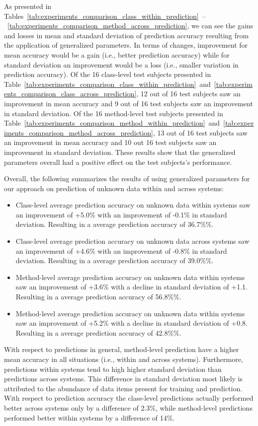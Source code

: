 As presented in Tables~\ref{tab:experiments_comparison_class_within_prediction}~--~\ref{tab:experiments_comparison_method_across_prediction}, we can see the gains and losses in mean and standard deviation of prediction accuracy resulting from the application of generalized parameters. In terms of changes, improvement for mean accuracy would be a gain (i.e., better prediction accuracy) while for standard deviation an improvement would be a loss (i.e., smaller variation in prediction accuracy). Of the 16 class-level test subjects presented in Table~\ref{tab:experiments_comparison_class_within_prediction}~and~\ref{tab:experiments_comparison_class_across_prediction}, 12 out of 16 test subjects saw an improvement in mean accuracy and 9 out of 16 test subjects saw an improvement in standard deviation. Of the 16 method-level test subjects presented in Table~\ref{tab:experiments_comparison_method_within_prediction}~and~\ref{tab:experiments_comparison_method_across_prediction}, 13 out of 16 test subjects saw an improvement in mean accuracy and 10 out 16 test subjects saw an improvement in standard deviation. These results show that the generalized parameters overall had a positive effect on the test subjects's performance. 

Overall, the following summarizes the results of using generalized parameters for our approach on prediction of unknown data within and across systems:
\begin{itemize}
  \item Class-level average prediction accuracy on unknown data within systems saw an improvement of +5.0\% with an improvement of -0.1\% in standard deviation. Resulting in a average prediction accuracy of 36.7\%\%.
  \item Class-level average prediction accuracy on unknown data across systems saw an improvement of +4.6\% with an improvement of -0.8\% in standard deviation. Resulting in a average prediction accuracy of 39.0\%\%.
  \item Method-level average prediction accuracy on unknown data within systems saw an improvement of +3.6\% with a decline in standard deviation of +1.1. Resulting in a average prediction accuracy of 56.8\%\%.
  \item Method-level average prediction accuracy on unknown data within systems saw an improvement of +5.2\% with a decline in standard deviation of +0.8. Resulting in a average prediction accuracy of 42.8\%\%.
\end{itemize}
With respect to predictions in general, method-level prediction have a higher mean accuracy in all situations (i.e., within and across systems). Furthermore, predictions within systems tend to high higher standard deviation than predictions across systems. This difference in standard deviation most likely is attributed to the abundance of data items present for training and prediction. With respect to prediction accuracy the class-level predictions actually performed better across systems only by a difference of 2.3\%, while method-level predictions performed better within systems by a difference of 14\%.

